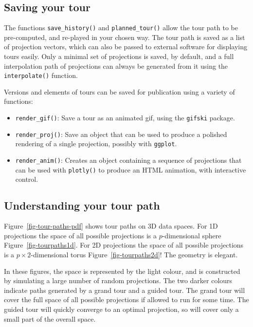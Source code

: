 \documentclass[
  letterpaper,
]{krantz}
\providecommand{\tightlist}{%
  \setlength{\itemsep}{0pt}\setlength{\parskip}{0pt}}\usepackage{longtable,booktabs,array}
\begin{document}
\subsection{Saving your tour}\label{saving-your-tour}

The functions \texttt{save\_history()} and \texttt{planned\_tour()}
allow the tour path to be pre-computed, and re-played in your chosen
way. The tour path is saved as a list of projection vectors, which can
also be passed to external software for displaying tours easily. Only a
minimal set of projections is saved, by default, and a full
interpolation path of projections can always be generated from it using
the \texttt{interpolate()} function.

Versions and elements of tours can be saved for publication using a
variety of functions:

\begin{itemize}
\tightlist
\item
  \texttt{render\_gif()}: Save a tour as an animated gif, using the
  \texttt{gifski} package.
\item
  \texttt{render\_proj()}: Save an object that can be used to produce a
  polished rendering of a single projection, possibly with
  \texttt{ggplot}.
\item
  \texttt{render\_anim()}: Creates an object containing a sequence of
  projections that can be used with \texttt{plotly()} to produce an HTML
  animation, with interactive control.
\end{itemize}

\subsection{Understanding your tour
path}\label{understanding-your-tour-path}

Figure~\ref{fig-tour-paths-pdf} shows tour paths on 3D data spaces. For
1D projections the space of all possible projections is a
\(p\)-dimensional sphere Figure~\ref{fig-tourpaths1d}. For 2D
projections the space of all possible projections is a
\(p\times 2\)-dimensional torus Figure~\ref{fig-tourpaths2d}! The
geometry is elegant.

In these figures, the space is represented by the light colour, and is
constructed by simulating a large number of random projections. The two
darker colours indicate paths generated by a grand tour and a guided
tour. The grand tour will cover the full space of all possible
projections if allowed to run for some time. The guided tour will
quickly converge to an optimal projection, so will cover only a small
part of the overall space.
\end{document}
